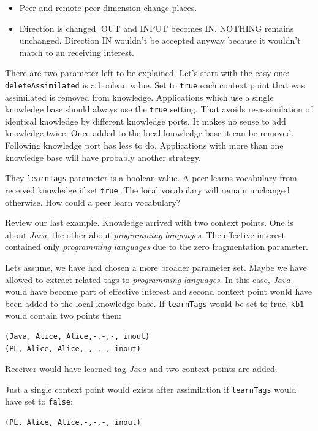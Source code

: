 \begin{itemize}
\item Peer and remote peer dimension change places.
\item Direction is changed. OUT and INPUT becomes IN. NOTHING remains unchanged. Direction IN wouldn't be accepted anyway because it wouldn't match to an receiving interest.
\end{itemize}

There are two parameter left to be explained. Let's start with the easy one: 
{\tt deleteAssimilated} is a boolean value. Set to {\tt true} each context point that was assimilated is removed from knowledge. Applications which use a single knowledge base should always use the {\tt true} setting. That avoids re-assimilation of identical knowledge by different knowledge ports. It makes no sense to add knowledge twice. Once added to the local knowledge base it can be removed. Following knowledge port has less to do. Applications with more than one knowledge base will have probably another strategy.

They {\tt learnTags} parameter is a boolean value. A peer learns vocabulary from received knowledge if set {\tt true}. The local vocabulary will remain unchanged otherwise. How could a peer learn vocabulary?

Review our last example. Knowledge arrived with two context points. One is about {\it Java}, the other about {\it programming languages}. The effective interest contained only {\it programming languages} due to the zero fragmentation parameter. 

Lets assume, we have had chosen a more broader parameter set. Maybe we have allowed to extract related tags to {\it programming languages}. In this case, {\it Java} would have become part of effective interest and second context point would have been added to the local knowledge base. If {\tt learnTags} would be set to true, {\tt kb1} would contain two points then:

\begin{verbatim}
(Java, Alice, Alice,-,-,-, inout)
(PL, Alice, Alice,-,-,-, inout)
\end{verbatim}

Receiver would have learned tag {\it Java} and two context points are added.

Just a single context point would exists after assimilation if {\tt learnTags} would have set to {\tt false}: 

\begin{verbatim}
(PL, Alice, Alice,-,-,-, inout)
\end{verbatim}

